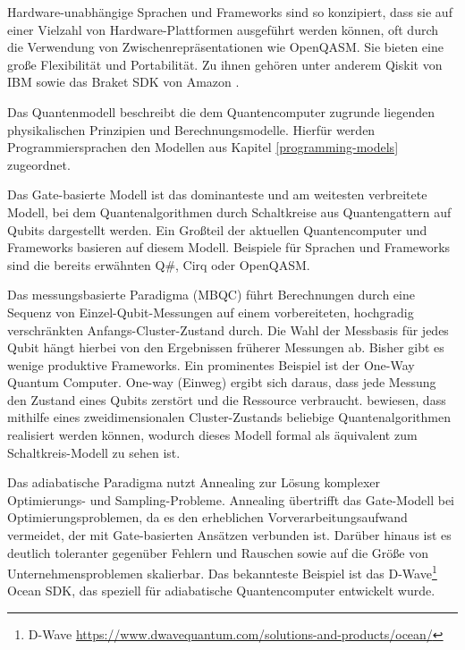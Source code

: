 \begin{defn}
Hardware-unabhängige Sprachen und Frameworks sind so konzipiert, dass sie auf einer Vielzahl von Hardware-Plattformen ausgeführt werden können, oft durch die Verwendung von Zwischenrepräsentationen wie OpenQASM. Sie bieten eine große Flexibilität und Portabilität. Zu ihnen gehören unter anderem Qiskit von IBM sowie das Braket SDK von Amazon \autocite{ferreiraExploratoryStudyUsage2025}.
\end{defn}

\begin{defn}[Quantenmodell]
\label{def:quantum-model}
Das Quantenmodell beschreibt die dem Quantencomputer zugrunde liegenden physikalischen Prinzipien und Berechnungsmodelle. Hierfür werden Programmiersprachen den Modellen aus Kapitel \ref{programming-models} zugeordnet.
\end{defn}

Das Gate-basierte Modell ist das dominanteste und am weitesten verbreitete Modell, bei dem Quantenalgorithmen durch Schaltkreise aus Quantengattern auf Qubits dargestellt werden. Ein Großteil der aktuellen Quantencomputer und Frameworks basieren auf diesem Modell. Beispiele für Sprachen und Frameworks sind die bereits erwähnten Q\#, Cirq oder OpenQASM. \autocite{ferreiraExploratoryStudyUsage2025}

Das messungsbasierte Paradigma (MBQC) führt Berechnungen durch eine Sequenz von Einzel-Qubit-Messungen auf einem vorbereiteten, hochgradig verschränkten Anfangs-Cluster-Zustand durch. Die Wahl der Messbasis für jedes Qubit hängt hierbei von den Ergebnissen früherer Messungen ab. Bisher gibt es wenige produktive Frameworks. Ein prominentes Beispiel ist der One-Way Quantum Computer. One-way (Einweg) ergibt sich daraus, dass jede Messung den Zustand eines Qubits zerstört und die Ressource verbraucht. \citeauthor{briegelMeasurementbasedQuantumComputation2009} bewiesen, dass mithilfe eines zweidimensionalen Cluster-Zustands beliebige Quantenalgorithmen realisiert werden können, wodurch dieses Modell formal als äquivalent zum Schaltkreis-Modell zu sehen ist. \autocite{briegelMeasurementbasedQuantumComputation2009}

Das adiabatische Paradigma nutzt Annealing zur Lösung komplexer Optimierungs- und Sampling-Probleme. Annealing übertrifft das Gate-Modell bei Optimierungsproblemen, da es den erheblichen Vorverarbeitungsaufwand vermeidet, der mit Gate-basierten Ansätzen verbunden ist. Darüber hinaus ist es deutlich toleranter gegenüber Fehlern und Rauschen sowie auf die Größe von Unternehmensproblemen skalierbar. \autocite{albash_adiabatic_2018} Das bekannteste Beispiel ist das D-Wave\footnote{D-Wave \url{https://www.dwavequantum.com/solutions-and-products/ocean/}} Ocean SDK, das speziell für adiabatische Quantencomputer entwickelt wurde. 

